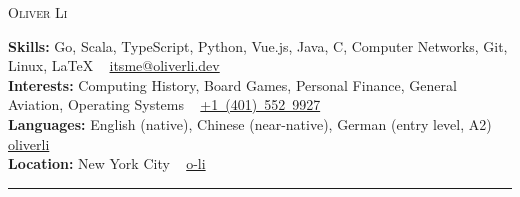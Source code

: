 \documentclass[11pt]{article}
\newcommand{\cvsection}[1]
{
	\begin{center}
		\large\textcolor{sectcol}{\textbf{#1}}
	\end{center}
}
\newcommand{\metasection}[2]
{
\footnotesize{#2} \hspace*{\fill} \footnotesize{#1}\\[1pt]
}
\begin{document}
\pagestyle{fancy}	








\vspace{-8pt}
\begin{center}
	\HUGE \textsc{Oliver Li}\\[2pt]
\end{center}



\vspace{6pt}


\metasection{\faEnvelope ~ \href{mailto:itsme@oliverli.dev}{itsme@oliverli.dev}}{\textbf{Skills:} Go, Scala, TypeScript, Python, Vue.js, Java, C, Computer Networks, Git, Linux, \LaTeX}
\metasection{\faPhone ~ \href{tel:+14015529927}{+1~(401)~552~9927}}{\textbf{Interests:} Computing History, Board Games, Personal Finance, General Aviation, Operating Systems} 
\metasection{\faGithub ~ \href{https://github.com/oliverli/}{oliverli}}{\textbf{Languages:} English (native), Chinese (near-native), German (entry level, A2)}
\metasection{\faLinkedin ~ \href{https://www.linkedin.com/in/o-li}{o-li}}{\textbf{Location:} New York City}
\vspace{-2pt}
\textcolor{softcol}{\hrule}
\vspace{6pt}

\normalsize

\end{document}
